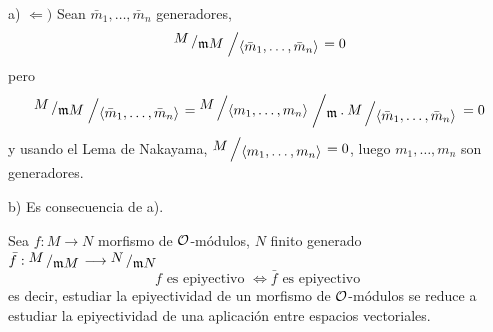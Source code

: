 \begin{dem}
    a) $\Leftarrow)$ Sean $\bar m_1, \ldots, \bar m_n$ generadores, 
    $$\modulo{\modulo{M}{\m M}}{\langle \bar m_1, \ldots,\bar  m_n \rangle} = 0$$
    pero $$\modulo{\modulo{M}{\m M}}{\langle \bar m_1, \ldots,\bar  m_n \rangle} = \modulo{\modulo{M}{\langle m_1, \ldots, m_n \rangle}}{\m \cdot \modulo{M}{\langle \bar m_1, \ldots,\bar  m_n \rangle}} =0 $$
    y usando el Lema de Nakayama, $\modulo{M}{\langle m_1, \ldots, m_n \rangle} = 0$, luego $m_1, \ldots, m_n$ son generadores. 

    b) Es consecuencia de a).
\end{dem}
\begin{ejer}
    Sea $f: M \longrightarrow N$ morfismo de $\mathcal{O}$-m\'odulos, $N$ finito generado \\ $\bar f : \modulo{M}{\m M} \longrightarrow \modulo{N}{\m N} $ 
    $$f \text{ es epiyectivo } \iff \bar f \text{ es epiyectivo }$$
    es decir, estudiar la epiyectividad de un morfismo de $\mathcal{O}$-m\'odulos se reduce a estudiar la epiyectividad de una aplicaci\'on entre espacios vectoriales. 
\end{ejer}
